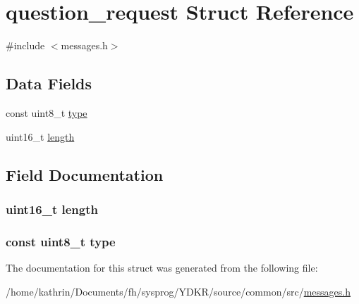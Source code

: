 \hypertarget{structquestion__request}{
\section{question\_\-request Struct Reference}
\label{structquestion__request}
}


{\ttfamily \#include $<$messages.h$>$}

\subsection*{Data Fields}
\begin{DoxyCompactItemize}
\item 
const uint8\_\-t \hyperlink{structquestion__request_aca7dafb0092715a03dd40f45fc607f2a}{type}
\item 
uint16\_\-t \hyperlink{structquestion__request_a1892eba2086d12ac2b09005aeb09ea3b}{length}
\end{DoxyCompactItemize}


\subsection{Field Documentation}
\hypertarget{structquestion__request_a1892eba2086d12ac2b09005aeb09ea3b}{
\subsubsection[{length}]{\setlength{\rightskip}{0pt plus 5cm}uint16\_\-t {\bf length}}}
\label{structquestion__request_a1892eba2086d12ac2b09005aeb09ea3b}
\hypertarget{structquestion__request_aca7dafb0092715a03dd40f45fc607f2a}{
\subsubsection[{type}]{\setlength{\rightskip}{0pt plus 5cm}const uint8\_\-t {\bf type}}}
\label{structquestion__request_aca7dafb0092715a03dd40f45fc607f2a}


The documentation for this struct was generated from the following file:\begin{DoxyCompactItemize}
\item 
/home/kathrin/Documents/fh/sysprog/YDKR/source/common/src/\hyperlink{messages_8h}{messages.h}\end{DoxyCompactItemize}

